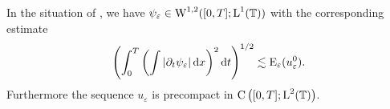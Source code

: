 \begin{lemma}
	\label{l2_bound_on_psi_varepsilon}
	In the situation of , we have $ \psi_{ 
	\varepsilon } \in \operatorname{W}^{ 1 , 2 } ( [ 0 , T ] ; \operatorname{L}^{ 1 } ( \mathbb{ T } ) ) 
	$ with the corresponding estimate
	\begin{equation}
		\label{bound_on_time_dv_of_psi_epsilon}
		\left(
		\int_{ 0 }^{ T }
		\left(
		\int
		\abs{ \partial_{ t } \psi_{ \varepsilon } }
		\dd{ x }
		\right)^{ 2 }
		\dd{ t }
		\right)^{ 1/2 }
		\lesssim
		\operatorname{E}_{ \varepsilon } ( u_{ \varepsilon }^{ 0 } ).
	\end{equation}
	Furthermore the sequence $ u_{ \varepsilon } $ is precompact in $ \operatorname{C} \left( [ 0 , T ] ; \operatorname{L}^{ 2 } ( \operatorname{\mathbb{T}} ) \right) $. 
\end{lemma}


